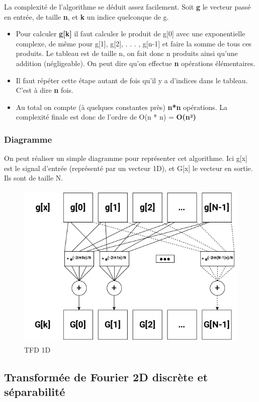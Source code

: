 \documentclass{article}
\begin{document}
La complexité de l'algorithme se déduit assez facilement. Soit \textbf{g} le vecteur passé en entrée, de taille \textbf{n}, et \textbf{k} un indice quelconque de g.
\begin{itemize}
	\item Pour calculer \textbf{g[k]} il faut calculer le produit de g[0] avec une exponentielle complexe, de même pour g[1], g[2], . . . , g[n-1] et faire la somme de tous ces produits. Le tableau est de taille n, on fait donc n produits ainsi qu'une addition (négligeable). On peut dire qu'on effectue \textbf{n} opérations élémentaires.
	\item Il faut répéter cette étape autant de fois qu'il y a d'indices dans le tableau. C'est à dire \textbf{n} fois.
	\item Au total on compte (à quelques constantes près) \textbf{n*n} opérations.
	La complexité finale est donc de l'ordre de O(n * n) = \textbf{O(n²)} 
\end{itemize}

\subsubsection{Diagramme}

On peut réaliser un simple diagramme pour représenter cet algorithme. Ici g[x] est le signal d'entrée (représenté par un vecteur 1D), et G[x] le vecteur en sortie. Ils sont de taille N.

\begin{figure}[!htb]
	\centering
	\includegraphics[height=8cm]{./assets/TFD1D.png}
	\caption{TFD 1D}
	\label{fig:TFD1D}
\end{figure}


\subsection{Transformée de Fourier 2D discrète et séparabilité}
\end{document}
